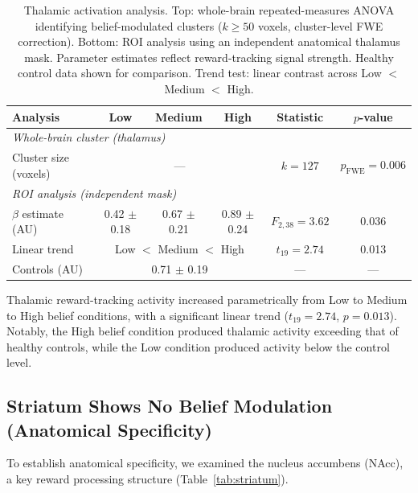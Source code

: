 \documentclass[11pt]{article}
\begin{document}
\begin{table}[H]
\centering
\caption{Thalamic activation analysis. Top: whole-brain repeated-measures ANOVA identifying belief-modulated clusters ($k \geq 50$ voxels, cluster-level FWE correction). Bottom: ROI analysis using an independent anatomical thalamus mask. Parameter estimates reflect reward-tracking signal strength. Healthy control data shown for comparison. Trend test: linear contrast across Low $<$ Medium $<$ High.}
\label{tab:thalamus}
\begin{tabular}{lccccc}
\toprule
\textbf{Analysis} & \textbf{Low} & \textbf{Medium} & \textbf{High} & \textbf{Statistic} & \textbf{$p$-value} \\
\midrule
\multicolumn{6}{l}{\textit{Whole-brain cluster (thalamus)}} \\
Cluster size (voxels) & \multicolumn{3}{c}{---} & $k = 127$ & $p_{\mathrm{FWE}} = 0.006$ \\
\midrule
\multicolumn{6}{l}{\textit{ROI analysis (independent mask)}} \\
$\beta$ estimate (AU) & 0.42 $\pm$ 0.18 & 0.67 $\pm$ 0.21 & 0.89 $\pm$ 0.24 & $F_{2,38} = 3.62$ & 0.036 \\
Linear trend & \multicolumn{3}{c}{Low $<$ Medium $<$ High} & $t_{19} = 2.74$ & 0.013 \\
Controls (AU) & \multicolumn{3}{c}{0.71 $\pm$ 0.19} & --- & --- \\
\bottomrule
\end{tabular}
\end{table}

Thalamic reward-tracking activity increased parametrically from Low to Medium to High belief conditions, with a significant linear trend ($t_{19} = 2.74$, $p = 0.013$). Notably, the High belief condition produced thalamic activity exceeding that of healthy controls, while the Low condition produced activity below the control level.

\subsection{Striatum Shows No Belief Modulation (Anatomical Specificity)}

To establish anatomical specificity, we examined the nucleus accumbens (NAcc), a key reward processing structure (Table~\ref{tab:striatum}).
\end{document}
